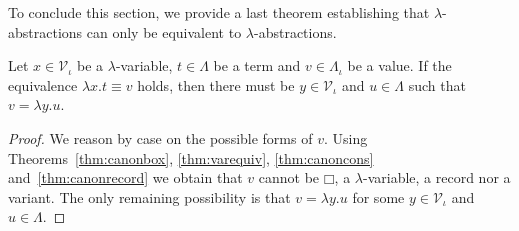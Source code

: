 To conclude this section, we provide a last theorem establishing that
$λ$-abstractions can only be equivalent to $λ$-abstractions.
\begin{theorem}\label{thm:canonlambda}%
  Let $x ∈ \mathcal{V}_{ι}$ be a $λ$-variable, $t ∈ Λ$ be a term and
  $v ∈ Λ_{ι}$ be a value. If the equivalence $λx.t ≡ v$ holds, then there
  must be $y ∈ \mathcal{V}_{ι}$ and $u ∈ Λ$ such that $v = λy.u$.
\end{theorem}
\begin{proof}
  We reason by case on the possible forms of $v$. Using
  Theorems~\ref{thm:canonbox}, \ref{thm:varequiv}, \ref{thm:canoncons}
  and~\ref{thm:canonrecord} we obtain that $v$ cannot be $□$,
  a $λ$-variable, a record nor a variant. The only remaining possibility is
  that $v = λy.u$ for some $y ∈ \mathcal{V}_{ι}$ and $u ∈ Λ$.
\end{proof}
